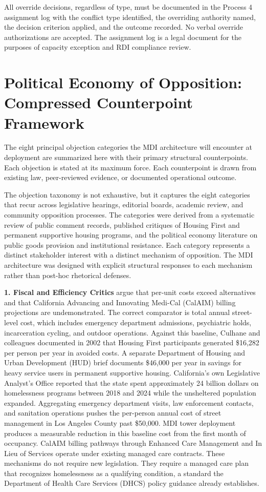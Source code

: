 \documentclass[12pt, letterpaper]{article}
\begin{document}
All override decisions, regardless of type, must be documented in the Process 4 assignment log with the conflict type identified, the overriding authority named, the decision criterion applied, and the outcome recorded. No verbal override authorizations are accepted. The assignment log is a legal document for the purposes of capacity exception and RDI compliance review.


\section{Political Economy of Opposition: Compressed Counterpoint Framework}

The eight principal objection categories the MDI architecture will encounter at deployment are summarized here with their primary structural counterpoints. Each objection is stated at its maximum force. Each counterpoint is drawn from existing law, peer-reviewed evidence, or documented operational outcome.

The objection taxonomy is not exhaustive, but it captures the eight categories that recur across legislative hearings, editorial boards, academic review, and community opposition processes. The categories were derived from a systematic review of public comment records, published critiques of Housing First and permanent supportive housing programs, and the political economy literature on public goods provision and institutional resistance. Each category represents a distinct stakeholder interest with a distinct mechanism of opposition. The MDI architecture was designed with explicit structural responses to each mechanism rather than post-hoc rhetorical defenses.

\textbf{1. Fiscal and Efficiency Critics} argue that per-unit costs exceed alternatives and that California Advancing and Innovating Medi-Cal (CalAIM) billing projections are undemonstrated. The correct comparator is total annual street-level cost, which includes emergency department admissions, psychiatric holds, incarceration cycling, and outdoor operations. Against this baseline, Culhane and colleagues documented in 2002 that Housing First participants generated \$16,282 per person per year in avoided costs. A separate Department of Housing and Urban Development (HUD) brief documents \$46,000 per year in savings for heavy service users in permanent supportive housing. California's own Legislative Analyst's Office reported that the state spent approximately 24 billion dollars on homelessness programs between 2018 and 2024 while the unsheltered population expanded. Aggregating emergency department visits, law enforcement contacts, and sanitation operations pushes the per-person annual cost of street management in Los Angeles County past \$50,000. MDI tower deployment produces a measurable reduction in this baseline cost from the first month of occupancy. CalAIM billing pathways through Enhanced Care Management and In Lieu of Services operate under existing managed care contracts. These mechanisms do not require new legislation. They require a managed care plan that recognizes homelessness as a qualifying condition, a standard the Department of Health Care Services (DHCS) policy guidance already establishes.
\end{document}
